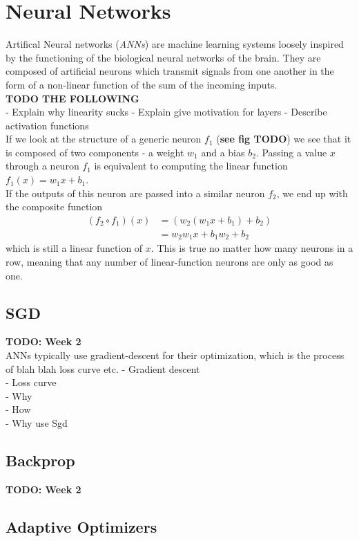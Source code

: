 \documentclass{report}
\begin{document}
	\section{Neural Networks}
	Artifical Neural networks (\textit{ANNs}) are machine learning systems loosely inspired by the functioning of the biological neural networks of the brain. They are composed of artificial neurons which transmit signals from one another in the form of a non-linear function of the sum of the incoming inputs.\\
	\textbf{TODO THE FOLLOWING} \\
	- Explain why linearity sucks
	- Explain give motivation for layers
	- Describe activation functions \\
	If we look at the structure of a generic neuron $f_1$ (\textbf{see fig TODO}) we see that it is composed of two components - a weight $w_1$ and a bias $b_2$. Passing a value $x$ through a neuron $f_1$ is equivalent to computing the linear function $f_1(x) = w_1x + b_1$. \\
	If the outputs of this neuron are passed into a similar neuron $f_2$, we end up with the composite function 
	\begin{align}
	(f_2\circ f_1)(x) &= (w_2(w_1x + b_1) + b_2) \\
	&= w_2w_1x + b_1w_2 + b_2	
	\end{align}
	which is still a linear function of $x$. This is true no matter how many neurons in a row, meaning that any number of linear-function neurons are only as good as one. \\
	
	\subsection{SGD}
	\textbf{TODO: Week 2} \\
	ANNs typically use gradient-descent for their optimization, which is the process of blah blah loss curve etc.
	- Gradient descent \\
	- Loss curve \\
	- Why \\
	- How \\
	- Why use Sgd
	

	\subsection{Backprop}
	\textbf{TODO: Week 2} \\
	\subsection{Adaptive Optimizers}
\end{document}
